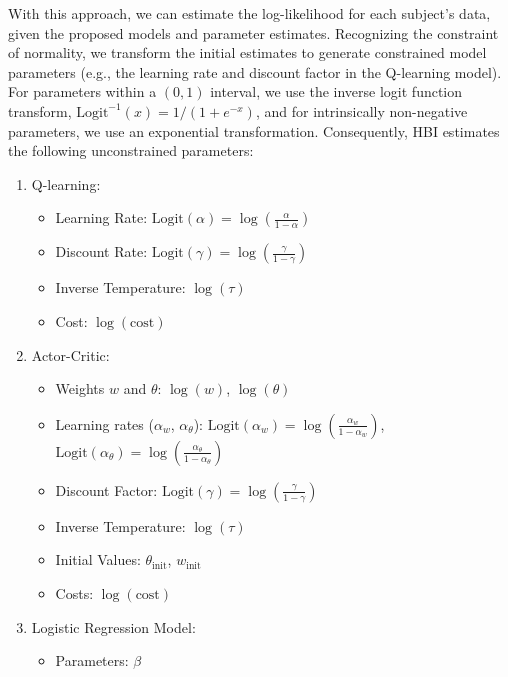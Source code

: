 \documentclass[
  number,
  preprint,
  3p,
  onecolumn]{elsarticle}
\providecommand{\tightlist}{%
  \setlength{\itemsep}{0pt}\setlength{\parskip}{0pt}}\usepackage{longtable,booktabs,array}
\begin{document}
With this approach, we can estimate the log-likelihood for each
subject's data, given the proposed models and parameter estimates.
Recognizing the constraint of normality, we transform the initial
estimates to generate constrained model parameters (e.g., the learning
rate and discount factor in the Q-learning model). For parameters within
a \((0,1)\) interval, we use the inverse logit function transform,
\(\text{Logit}^{-1}(x)=1/(1+e^{-x})\), and for intrinsically
non-negative parameters, we use an exponential transformation.
Consequently, HBI estimates the following unconstrained parameters:

\begin{enumerate}
\def\labelenumi{\arabic{enumi}.}
\tightlist
\item
  Q-learning:

  \begin{itemize}
  \tightlist
  \item
    Learning Rate:
    \(\text{Logit}(\alpha)=\log(\frac{\alpha}{1-\alpha})\)
  \item
    Discount Rate:
    \(\text{Logit}(\gamma)=\log(\frac{\gamma}{1-\gamma})\)
  \item
    Inverse Temperature: \(\log(\tau)\)
  \item
    Cost: \(\log(\text{cost})\)
  \end{itemize}
\item
  Actor-Critic:

  \begin{itemize}
  \tightlist
  \item
    Weights \(w\) and \(\theta\): \(\log(w)\), \(\log(\theta)\)
  \item
    Learning rates (\(\alpha_w\), \(\alpha_\theta\)):
    \(\text{Logit}(\alpha_w)=\log(\frac{\alpha_w}{1-\alpha_w})\),
    \(\text{Logit}(\alpha_\theta)=\log(\frac{\alpha_\theta}{1-\alpha_\theta})\)
  \item
    Discount Factor:
    \(\text{Logit}(\gamma)=\log(\frac{\gamma}{1-\gamma})\)
  \item
    Inverse Temperature: \(\log(\tau)\)
  \item
    Initial Values: \(\theta_{\text{init}}\), \(w_{\text{init}}\)
  \item
    Costs: \(\log(\text{cost})\)
  \end{itemize}
\item
  Logistic Regression Model:

  \begin{itemize}
  \tightlist
  \item
    Parameters: \(\beta\)
  \end{itemize}
\end{enumerate}
\end{document}
